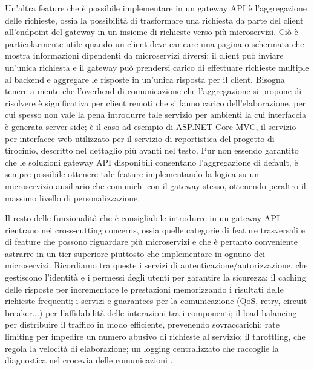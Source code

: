Un'altra feature che è possibile implementare in un gateway API è l'aggregazione delle richieste, ossia la possibilità di trasformare una richiesta da parte del client all'endpoint del gateway in un insieme di richieste verso più microservizi. Ciò è particolarmente utile quando un client deve caricare una pagina o schermata che mostra informazioni dipendenti da microservizi diversi: il client può inviare un'unica richiesta e il gateway può prendersi carico di effettuare richieste multiple al backend e aggregare le risposte in un'unica risposta per il client.
Bisogna tenere a mente che l'overhead di comunicazione che l'aggregazione si propone di risolvere è significativa per client remoti che si fanno carico dell'elaborazione, per cui spesso non vale la pena introdurre tale servizio per ambienti la cui interfaccia è generata server-side; è il caso ad esempio di ASP.NET Core MVC, il servizio per interfacce web utilizzato per il servizio di reportistica del progetto di tirocinio, descritto nel dettaglio più avanti nel testo.
Pur non essendo garantito che le soluzioni gateway API disponibili consentano l'aggregazione di default, è sempre possibile ottenere tale feature implementando la logica su un microservizio ausiliario che comunichi con il gateway stesso, ottenendo peraltro il massimo livello di personalizzazione.

Il resto delle funzionalità che è consigliabile introdurre in un gateway API rientrano nei cross-cutting concerns, ossia quelle categorie di feature trasversali e di feature che possono riguardare più microservizi e che è pertanto conveniente astrarre in un tier superiore piuttosto che implementare in ognuno dei microservizi. Ricordiamo tra queste i servizi di autenticazione/autorizzazione, che gestiscono l'identità e i permessi degli utenti per garantire la sicurezza; il caching delle risposte per incrementare le prestazioni memorizzando i risultati delle richieste frequenti; i servizi e guarantees per la comunicazione (QoS, retry, circuit breaker...) per l'affidabilità delle interazioni tra i componenti; il load balancing per distribuire il traffico in modo efficiente, prevenendo sovraccarichi; rate limiting per impedire un numero abusivo di richieste al servizio; il throttling, che regola la velocità di elaborazione; un logging centralizzato che raccoglie la diagnostica nel crocevia delle comunicazioni \cite[44-45]{.NET_Microservices}.

